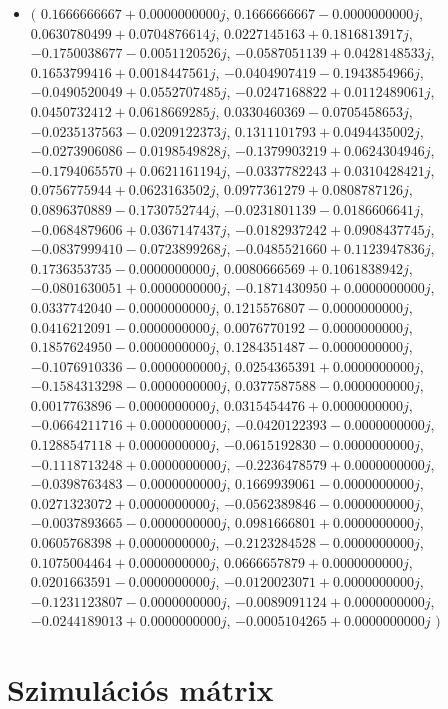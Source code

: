\documentclass[14pt,a4paper]{article}
\begin{document}
\begin{itemize}
\item
$\big($
$0.1666666667+0.0000000000j$, $0.1666666667-0.0000000000j$, $0.0630780499+0.0704876614j$, $0.0227145163+0.1816813917j$, $-0.1750038677-0.0051120526j$, $-0.0587051139+0.0428148533j$, $0.1653799416+0.0018447561j$, $-0.0404907419-0.1943854966j$, $-0.0490520049+0.0552707485j$, $-0.0247168822+0.0112489061j$, $0.0450732412+0.0618669285j$, $0.0330460369-0.0705458653j$, $-0.0235137563-0.0209122373j$, $0.1311101793+0.0494435002j$, $-0.0273906086-0.0198549828j$, $-0.1379903219+0.0624304946j$, $-0.1794065570+0.0621161194j$, $-0.0337782243+0.0310428421j$, $0.0756775944+0.0623163502j$, $0.0977361279+0.0808787126j$, $0.0896370889-0.1730752744j$, $-0.0231801139-0.0186606641j$, $-0.0684879606+0.0367147437j$, $-0.0182937242+0.0908437745j$, $-0.0837999410-0.0723899268j$, $-0.0485521660+0.1123947836j$, $0.1736353735-0.0000000000j$, $0.0080666569+0.1061838942j$, $-0.0801630051+0.0000000000j$, $-0.1871430950+0.0000000000j$, $0.0337742040-0.0000000000j$, $0.1215576807-0.0000000000j$, $0.0416212091-0.0000000000j$, $0.0076770192-0.0000000000j$, $0.1857624950-0.0000000000j$, $0.1284351487-0.0000000000j$, $-0.1076910336-0.0000000000j$, $0.0254365391+0.0000000000j$, $-0.1584313298-0.0000000000j$, $0.0377587588-0.0000000000j$, $0.0017763896-0.0000000000j$, $0.0315454476+0.0000000000j$, $-0.0664211716+0.0000000000j$, $-0.0420122393-0.0000000000j$, $0.1288547118+0.0000000000j$, $-0.0615192830-0.0000000000j$, $-0.1118713248+0.0000000000j$, $-0.2236478579+0.0000000000j$, $-0.0398763483-0.0000000000j$, $0.1669939061-0.0000000000j$, $0.0271323072+0.0000000000j$, $-0.0562389846-0.0000000000j$, $-0.0037893665-0.0000000000j$, $0.0981666801+0.0000000000j$, $0.0605768398+0.0000000000j$, $-0.2123284528-0.0000000000j$, $0.1075004464+0.0000000000j$, $0.0666657879+0.0000000000j$, $0.0201663591-0.0000000000j$, $-0.0120023071+0.0000000000j$, $-0.1231123807-0.0000000000j$, $-0.0089091124+0.0000000000j$, $-0.0244189013+0.0000000000j$, $-0.0005104265+0.0000000000j$
$\big)$
\end{itemize}
\section{Szimulációs mátrix}
\end{document}
